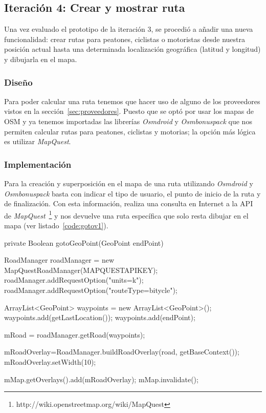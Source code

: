 \subsection{Iteración 4: Crear y mostrar ruta}

Una vez evaluado el prototipo de la iteración 3, se procedió a añadir una nueva funcionalidad: crear
rutas para peatones, ciclistas o motoristas desde nuestra posición actual hasta una determinada
localización geográfica (latitud y longitud) y dibujarla en el mapa.

\subsubsection{Diseño}

Para poder calcular una ruta tenemos que hacer uso de alguno de los proveedores vistos en la
sección~\ref{sec:proveedores}. Puesto que se optó por usar los mapas de \acs{OSM} y ya tenemos
importadas las librerías \emph{Osmdroid} y \emph{Osmbonuspack} que nos permiten calcular rutas para
peatones, ciclistas y motorias; la opción más lógica es utilizar \emph{MapQuest}.

\subsubsection{Implementación}

Para la creación y superposición en el mapa de una ruta utilizando \emph{Osmdroid} y
\emph{Osmbonuspack} basta con indicar el tipo de usuario, el punto de inicio de la ruta y de
finalización. Con esta información, realiza una consulta en Internet a la \acs{API} de
\emph{MapQuest}~\footnote{http://wiki.openstreetmap.org/wiki/MapQuest} y nos devuelve una ruta
específica que solo resta dibujar en el mapa (ver listado~\ref{code:gotov1}).

\begin{listing}[
  float=ht,
  language = java,
  caption  = {Ejemplo de creación y superposición de una ruta en el mapa},
  label    = code:gotov1]
private Boolean gotoGeoPoint(GeoPoint endPoint) {
    RoadManager roadManager = new MapQuestRoadManager(MAPQUESTAPIKEY);
    roadManager.addRequestOption("units=k");
    roadManager.addRequestOption("routeType=bitycle");
    
    ArrayList<GeoPoint> waypoints = new ArrayList<GeoPoint>();
    waypoints.add(getLastLocation());
    waypoints.add(endPoint);
    
    mRoad = roadManager.getRoad(waypoints);
            
    mRoadOverlay=RoadManager.buildRoadOverlay(road, getBaseContext());
    mRoadOverlay.setWidth(10);

    mMap.getOverlays().add(mRoadOverlay);            
    mMap.invalidate();
}
\end{listing}

